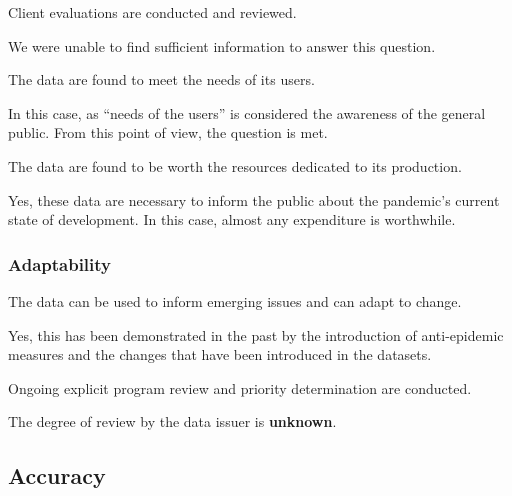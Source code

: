 \begin{QandA}
    \item Client evaluations are conducted and reviewed.
    \begin{answered}
        We were unable to find sufficient information to answer this question.
    \end{answered}

    \item The data are found to meet the needs of its users.
    \begin{answered}
        In this case, as \enquote{needs of the users} is considered the awareness of the general public.
        From this point of view, the question is met.
    \end{answered}

    \item The data are found to be worth the resources dedicated to its production.
    \begin{answered}
        Yes, these data are necessary to inform the public about the pandemic's current state of development.
        In this case, almost any expenditure is worthwhile.
    \end{answered}

\end{QandA}

\subsubsection{Adaptability}

\begin{QandA}
    \item The data can be used to inform emerging issues and can adapt to change.
    \begin{answered}
        Yes, this has been demonstrated in the past by the introduction of anti-epidemic measures and the changes that have been introduced in the datasets.
    \end{answered}

    \item Ongoing explicit program review and priority determination are conducted.
    \begin{answered}
        The degree of review by the data issuer is \textbf{unknown}.
    \end{answered}

\end{QandA}

\newpage
\subsection{Accuracy}

